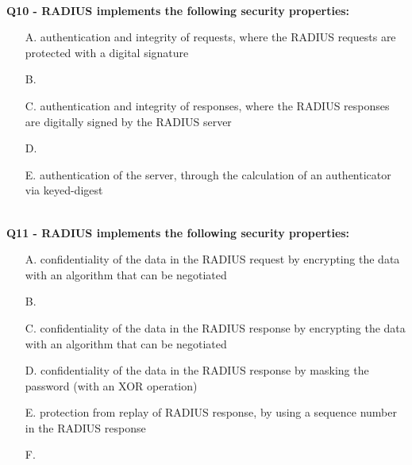\textbf{\\Q10 - RADIUS implements the following security properties:}
\begin{itemize}
    \item[A.] authentication and integrity of requests, where the RADIUS requests are protected with a digital signature
    \item[B.] 
    \item[C.] authentication and integrity of responses, where the RADIUS responses are digitally signed by the RADIUS server
    \item[D.] 
    \item[E.] authentication of the server, through the calculation of an authenticator via keyed-digest
\end{itemize}

\textbf{\\Q11 - RADIUS implements the following security properties:}
\begin{itemize}
    \item[A.] confidentiality of the data in the RADIUS request by encrypting the data with an algorithm that can be negotiated
    \item[B.] 
    \item[C.] confidentiality of the data in the RADIUS response by encrypting the data with an algorithm that can be negotiated
    \item[D.] confidentiality of the data in the RADIUS response by masking the password (with an XOR operation)
    \item[E.] protection from replay of RADIUS response, by using a sequence number in the RADIUS response
    \item[F.] 
\end{itemize}

